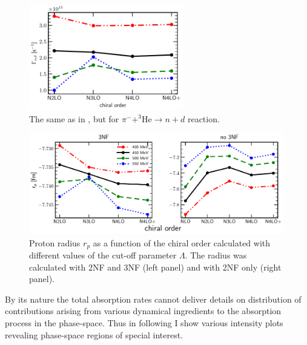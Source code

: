     \begin{figure}[h]
        \begin{center}
        \includegraphics[width=0.6\textwidth]{PlotData/PION/Dalitz_maps/figures/Gamma_nd.pdf}
        \end{center}
        \caption{The same as in , but for $\pi^- + ^3\text{He} \rightarrow n + d$ reaction.}
        \label{Gamma_nd}
    \end{figure}

    \begin{figure}[h]
        \begin{center}
        \includegraphics[width=0.99\textwidth]{PlotData/PION/Dalitz_maps/figures/proton_radius_mt31_3NF.pdf}
        \end{center}
        \caption{ Proton radius $r_p$ as a function of the chiral order calculated with
        different values of the cut-off parameter $\Lambda$. The radius was calculated with 2NF and 3NF (left panel)
        and with 2NF only (right panel).}
        \label{proton_rad}
    \end{figure}


    By its nature the total absorption rates cannot deliver details
    on distribution of contributions arising from various dynamical ingredients
    to the absorption process in  the phase-space. Thus in following I show 
    various intensity plots revealing phase-space regions of special interest.

